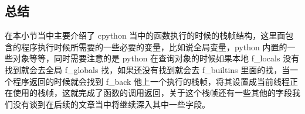 \subsection{总结}
在本小节当中主要介绍了 cpython 当中的函数执行的时候的栈帧结构，这里面包含的程序执行时候所需要的一些必要的变量，比如说全局变量，python 内置的一些对象等等，同时需要注意的是 python 在查询对象的时候如果本地 f\_locals 没有找到就会去全局 f\_globals 找，如果还没有找到就会去 f\_builtins 里面的找，当一个程序返回的时候就会找到 f\_back 他上一个执行的栈帧，将其设置成当前线程正在使用的栈帧，这就完成了函数的调用返回，关于这个栈帧还有一些其他的字段我们没有谈到在后续的文章当中将继续深入其中一些字段。

